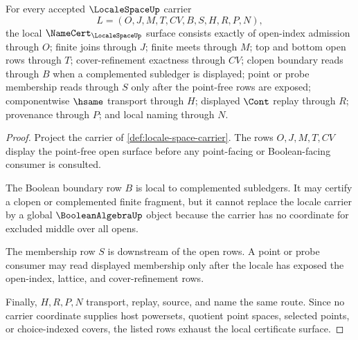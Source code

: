 \begin{theorem}
\label{thm:locale-space-namecert-obligations}
For every accepted $\LocaleSpaceUp$ carrier
$$
L=(O,J,M,T,CV,B,S,H,R,P,N),
$$
the local $\NameCert_{\LocaleSpaceUp}$ surface consists exactly of open-index admission through $O$; finite joins through $J$; finite meets through $M$; top and bottom open rows through $T$; cover-refinement exactness through $CV$; clopen boundary reads through $B$ when a complemented subledger is displayed; point or probe membership reads through $S$ only after the point-free rows are exposed; componentwise $\hsame$ transport through $H$; displayed $\Cont$ replay through $R$; provenance through $P$; and local naming through $N$.
\end{theorem}
\begin{proof}
Project the carrier of \autoref{def:locale-space-carrier}. The rows $O,J,M,T,CV$ display the point-free open surface before any point-facing or Boolean-facing consumer is consulted.

The Boolean boundary row $B$ is local to complemented subledgers. It may certify a clopen or complemented finite fragment, but it cannot replace the locale carrier by a global $\BooleanAlgebraUp$ object because the carrier has no coordinate for excluded middle over all opens.

The membership row $S$ is downstream of the open rows. A point or probe consumer may read displayed membership only after the locale has exposed the open-index, lattice, and cover-refinement rows.

Finally, $H,R,P,N$ transport, replay, source, and name the same route. Since no carrier coordinate supplies host powersets, quotient point spaces, selected points, or choice-indexed covers, the listed rows exhaust the local certificate surface.
\end{proof}

